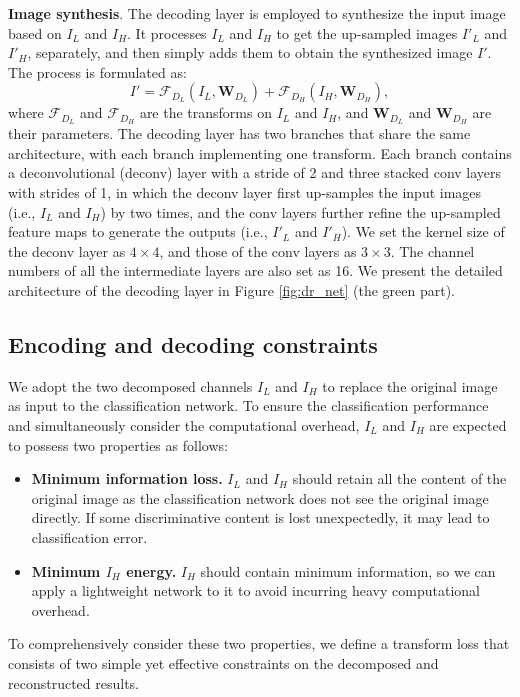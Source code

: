 \documentclass[letterpaper]{article} %
\begin{document}
\noindent\textbf{Image synthesis}. 
The decoding layer is employed to synthesize the input image based on $I_L$ and $I_H$. It processes $I_L$ and $I_H$ to get the up-sampled images $I{'}_L$ and $I{'}_H$, separately, and then simply adds them to obtain the synthesized image $I{'}$. The process is formulated as:
\begin{equation} 
   I' = \mathcal{F}_{D_L}(I_L, \mathbf{W}_{D_L}) + \mathcal{F}_{D_H}(I_H, \mathbf{W}_{D_H}),
\end{equation}
where $\mathcal{F}_{D_L}$ and $\mathcal{F}_{D_H}$ are the transforms on $I_L$ and $I_H$, and  $\mathbf{W}_{D_L}$ and $\mathbf{W}_{D_H}$ are their parameters. The decoding layer has two branches that share the same architecture, with each branch implementing one transform. Each branch contains a deconvolutional (deconv) layer with a stride of 2 and three stacked conv layers with strides of 1, in which the deconv layer first up-samples the input images (i.e., $I_L$ and $I_H$) by two times, and the conv layers further refine the up-sampled feature maps to generate the outputs (i.e., $I{'}_L$ and $I{'}_H$). We set the kernel size of the deconv layer as $4 \times 4$, and those of the conv layers as $3 \times 3$. The channel numbers of all the intermediate layers are also set as 16. We present the detailed architecture of the decoding layer in Figure \ref{fig:dr_net} (the green part).


\subsection{Encoding and decoding constraints}
We adopt the two decomposed channels $I_L$ and $I_H$ to replace the original image as input to the classification network.  To ensure the classification performance and simultaneously consider the computational overhead, $I_L$ and $I_H$ are expected to possess two properties as follows:
\begin{itemize}
  \item \textbf{Minimum information loss. } $I_L$ and $I_H$ should retain all the content of the original image as the classification network does not see the original image directly. If some discriminative content is lost unexpectedly, it may lead to classification error.
  \item \textbf{Minimum $I_H$ energy. } $I_H$ should contain minimum information, so we can apply a lightweight network to it to avoid incurring heavy computational overhead.
\end{itemize}
To comprehensively consider these two properties, we define a transform loss that consists of two simple yet effective constraints on the decomposed and reconstructed results. 
\end{document}
